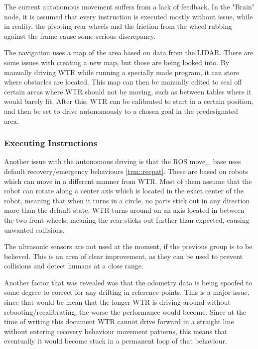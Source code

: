 The current autonomous movement suffers from a lack of feedback.
In the "Brain" node, it is assumed that every instruction is executed mostly without issue, while in reality, the pivoting rear wheels and the friction from the wheel rubbing against the frame cause some serious discrepancy.

The navigation uses a map of the area based on data from the LIDAR.
There are some issues with creating a new map, but those are being looked into.
By manually driving WTR while running a specially made program, it can store where obstacles are located.
This map can then be manually edited to seal off certain areas where WTR should not be moving, such as between tables where it would barely fit.
After this, WTR can be calibrated to start in a certain position, and then be set to drive autonomously to a chosen goal in the predesignated area.

\subsubsection{Executing Instructions}
Another issue with the autonomous driving is that the ROS move\_ base uses default recovery/emergency behaviours \ref{trm::recpat}.
These are based on robots which can move in a different manner from WTR.
Most of them assume that the robot can rotate along a center axis which is located in the exact center of the robot, meaning that when it turns in a circle, no parts stick out in any direction more than the default state.
WTR turns around on an axis located in between the two front wheels, meaning the rear sticks out further than expected, causing unwanted collisions.

The ultrasonic sensors are not used at the moment, if the previous group is to be believed.
This is an area of clear improvement, as they can be used to prevent collisions and detect humans at a close range.

Another factor that was revealed was that the odometry data is being spoofed to some degree to correct for any drifting in reference points.
This is a major issue, since that would be mean that the longer WTR is driving around without rebooting/recalibrating, the worse the performance would become.
Since at the time of writing this document WTR cannot drive forward in a straight line without entering recovery behaviour movement patterns, this means that eventually it would become stuck in a permanent loop of that behaviour.



\newpage

